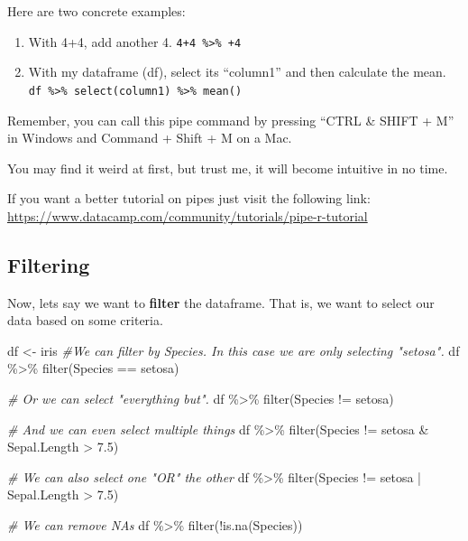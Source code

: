 \documentclass[
]{book}
\newenvironment{Shaded}{\begin{snugshade}}{\end{snugshade}}
\newcommand{\CommentTok}[1]{\textcolor[rgb]{0.56,0.35,0.01}{\textit{#1}}}
\newcommand{\FloatTok}[1]{\textcolor[rgb]{0.00,0.00,0.81}{#1}}
\newcommand{\FunctionTok}[1]{\textcolor[rgb]{0.00,0.00,0.00}{#1}}
\newcommand{\NormalTok}[1]{#1}
\newcommand{\OtherTok}[1]{\textcolor[rgb]{0.56,0.35,0.01}{#1}}
\newcommand{\SpecialCharTok}[1]{\textcolor[rgb]{0.00,0.00,0.00}{#1}}
\newcommand{\StringTok}[1]{\textcolor[rgb]{0.31,0.60,0.02}{#1}}
\begin{document}
Here are two concrete examples:

\begin{enumerate}
\def\labelenumi{\arabic{enumi}.}
\item
  With 4+4, add another 4.
  \texttt{4+4\ \%\textgreater{}\%\ +4}
\item
  With my dataframe (df), select its ``column1'' and then calculate the mean.
  \texttt{df\ \%\textgreater{}\%\ select(column1)\ \%\textgreater{}\%\ mean()}
\end{enumerate}

Remember, you can call this pipe command by pressing ``CTRL \& SHIFT + M'' in Windows and Command + Shift + M on a Mac.

You may find it weird at first, but trust me, it will become intuitive in no time.

If you want a better tutorial on pipes just visit the following link: \url{https://www.datacamp.com/community/tutorials/pipe-r-tutorial}

\hypertarget{filtering}{%
\subsection{Filtering}\label{filtering}}

Now, lets say we want to \textbf{filter} the dataframe.
That is, we want to select our data based on some criteria.

\begin{Shaded}
\begin{Highlighting}[]
\NormalTok{df }\OtherTok{\textless{}{-}}\NormalTok{ iris}
\CommentTok{\#We can filter by Species. In this case we are only selecting "setosa".}
\NormalTok{df }\SpecialCharTok{\%\textgreater{}\%} 
  \FunctionTok{filter}\NormalTok{(Species }\SpecialCharTok{==} \StringTok{\textquotesingle{}setosa\textquotesingle{}}\NormalTok{)}

\CommentTok{\# Or we can select "everything but".}
\NormalTok{df }\SpecialCharTok{\%\textgreater{}\%} 
  \FunctionTok{filter}\NormalTok{(Species }\SpecialCharTok{!=} \StringTok{\textquotesingle{}setosa\textquotesingle{}}\NormalTok{)}

\CommentTok{\# And we can even select multiple things}
\NormalTok{df }\SpecialCharTok{\%\textgreater{}\%} 
  \FunctionTok{filter}\NormalTok{(Species }\SpecialCharTok{!=} \StringTok{\textquotesingle{}setosa\textquotesingle{}} \SpecialCharTok{\&}\NormalTok{ Sepal.Length }\SpecialCharTok{\textgreater{}} \FloatTok{7.5}\NormalTok{)}

\CommentTok{\# We can also select one "OR" the other}
\NormalTok{df }\SpecialCharTok{\%\textgreater{}\%} 
  \FunctionTok{filter}\NormalTok{(Species }\SpecialCharTok{!=} \StringTok{\textquotesingle{}setosa\textquotesingle{}} \SpecialCharTok{|}\NormalTok{ Sepal.Length }\SpecialCharTok{\textgreater{}} \FloatTok{7.5}\NormalTok{)}

\CommentTok{\# We can remove NAs}
\NormalTok{df }\SpecialCharTok{\%\textgreater{}\%} 
  \FunctionTok{filter}\NormalTok{(}\SpecialCharTok{!}\FunctionTok{is.na}\NormalTok{(Species))}
\end{Highlighting}
\end{Shaded}
\end{document}
